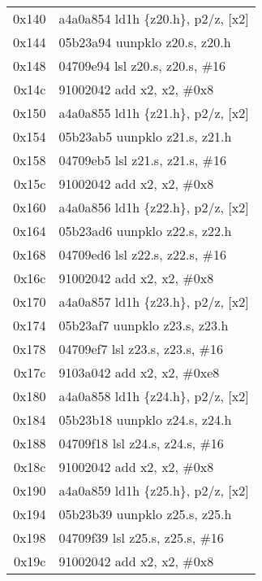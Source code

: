 \documentclass[11pt,a4paper]{article}
\begin{document}
\begin{longtable}{|r|l|}
\rowcolor{matrixload} 0x140 & a4a0a854 \quad ld1h \{z20.h\}, p2/z, [x2] \\
\rowcolor{conversion} 0x144 & 05b23a94 \quad uunpklo z20.s, z20.h \\
\rowcolor{conversion} 0x148 & 04709e94 \quad lsl z20.s, z20.s, \#16 \\
\rowcolor{address} 0x14c & 91002042 \quad add x2, x2, \#0x8 \\
\rowcolor{matrixload} 0x150 & a4a0a855 \quad ld1h \{z21.h\}, p2/z, [x2] \\
\rowcolor{conversion} 0x154 & 05b23ab5 \quad uunpklo z21.s, z21.h \\
\rowcolor{conversion} 0x158 & 04709eb5 \quad lsl z21.s, z21.s, \#16 \\
\rowcolor{address} 0x15c & 91002042 \quad add x2, x2, \#0x8 \\
\rowcolor{matrixload} 0x160 & a4a0a856 \quad ld1h \{z22.h\}, p2/z, [x2] \\
\rowcolor{conversion} 0x164 & 05b23ad6 \quad uunpklo z22.s, z22.h \\
\rowcolor{conversion} 0x168 & 04709ed6 \quad lsl z22.s, z22.s, \#16 \\
\rowcolor{address} 0x16c & 91002042 \quad add x2, x2, \#0x8 \\
\rowcolor{matrixload} 0x170 & a4a0a857 \quad ld1h \{z23.h\}, p2/z, [x2] \\
\rowcolor{conversion} 0x174 & 05b23af7 \quad uunpklo z23.s, z23.h \\
\rowcolor{conversion} 0x178 & 04709ef7 \quad lsl z23.s, z23.s, \#16 \\
\rowcolor{address} 0x17c & 9103a042 \quad add x2, x2, \#0xe8 \\
\rowcolor{matrixload} 0x180 & a4a0a858 \quad ld1h \{z24.h\}, p2/z, [x2] \\
\rowcolor{conversion} 0x184 & 05b23b18 \quad uunpklo z24.s, z24.h \\
\rowcolor{conversion} 0x188 & 04709f18 \quad lsl z24.s, z24.s, \#16 \\
\rowcolor{address} 0x18c & 91002042 \quad add x2, x2, \#0x8 \\
\rowcolor{matrixload} 0x190 & a4a0a859 \quad ld1h \{z25.h\}, p2/z, [x2] \\
\rowcolor{conversion} 0x194 & 05b23b39 \quad uunpklo z25.s, z25.h \\
\rowcolor{conversion} 0x198 & 04709f39 \quad lsl z25.s, z25.s, \#16 \\
\rowcolor{address} 0x19c & 91002042 \quad add x2, x2, \#0x8 \\

\end{longtable}
\end{document}
